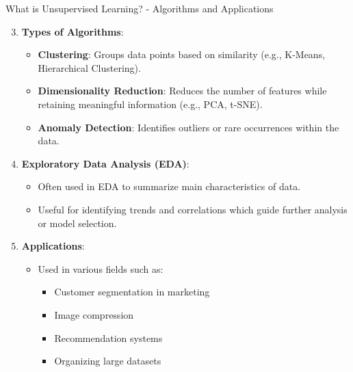 \documentclass[aspectratio=169]{beamer}
\begin{document}
\begin{frame}[fragile]{What is Unsupervised Learning? - Algorithms and Applications}
    \begin{enumerate}
        \setcounter{enumi}{2}
        \item \textbf{Types of Algorithms}:
            \begin{itemize}
                \item \textbf{Clustering}: Groups data points based on similarity (e.g., K-Means, Hierarchical Clustering).
                \item \textbf{Dimensionality Reduction}: Reduces the number of features while retaining meaningful information (e.g., PCA, t-SNE).
                \item \textbf{Anomaly Detection}: Identifies outliers or rare occurrences within the data.
            \end{itemize}

        \item \textbf{Exploratory Data Analysis (EDA)}:
            \begin{itemize}
                \item Often used in EDA to summarize main characteristics of data.
                \item Useful for identifying trends and correlations which guide further analysis or model selection.
            \end{itemize}

        \item \textbf{Applications}:
            \begin{itemize}
                \item Used in various fields such as:
                \begin{itemize}
                    \item Customer segmentation in marketing
                    \item Image compression
                    \item Recommendation systems
                    \item Organizing large datasets
                \end{itemize}
            \end{itemize}
    \end{enumerate}
\end{frame}
\end{document}
